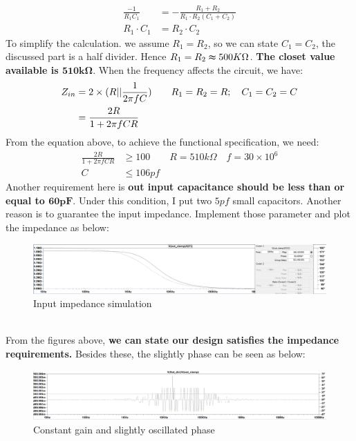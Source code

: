 \documentclass[pdftex,12pt,a4paper]{article}
\begin{document}
\begin{align}
\frac{-1}{R_1C_1}&=-\frac{R_1+R_2}{R_1\cdot R_2(C_1+C_2)}\\
R_1\cdot C_1&=R_2\cdot C_2
\end{align}
To simplify the calculation. we assume $R_1=R_2$, so we can state $C_1=C_2$, the discussed part is a half divider. Hence $R_1=R_2\thickapprox 500K\Omega$. \textbf{The closet value available is $\mathbf{510k\Omega}$}. When the frequency affects the circuit, we have:
\begin{align}
Z_{in}&=2\times (R||\frac{1}{2\pi fC})\qquad R_1=R_2=R;\quad C_1=C_2=C\\
&=\frac{2R}{1+2\pi fCR}\notag
\end{align}
From the equation above, to achieve the functional specification, we need:
\begin{align}
\frac{2R}{1+2\pi fCR}&\geq 100\qquad R=510k\Omega\quad f=30\times 10^6\\
C& \leq 106pf
\end{align}
Another requirement here is \textbf{out input capacitance should be less than or equal to $\mathbf{60pF}$}. Under this condition, I put two ${5pf}$ small capacitors. Another reason is to guarantee the input impedance. Implement those parameter and plot the impedance as below:
\begin{figure}[H]
\centering
\includegraphics[width=17cm]{impedance.png}
\caption{Input impedance simulation}
\end{figure}
~\\From the figures above, \textbf{we can state our design satisfies the impedance requirements.}
Besides these, the slightly phase can be seen as below:
\begin{figure}[H]
\centering
\includegraphics[width=17cm]{phase.png}
\caption{Constant gain and slightly oscillated phase}
\end{figure}
\end{document}
